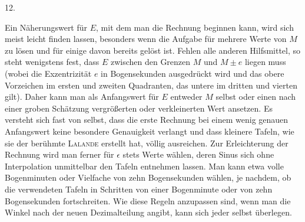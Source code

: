 \par{}
\begin{center}
12.
\end{center}
Ein Näherungswert für $E$, mit dem man die Rechnung beginnen kann, wird sich meist leicht finden lassen, besonders wenn die Aufgabe für mehrere Werte von $M$ zu lösen und für einige davon bereits gelöst ist. Fehlen alle anderen Hilfsmittel, so steht wenigstens fest, dass $E$ zwischen den Grenzen $M$ und $M \pm e$ liegen muss (wobei die Exzentrizität $e$ in Bogensekunden ausgedrückt wird und das obere Vorzeichen im ersten und zweiten Quadranten, das untere im dritten und vierten gilt). Daher kann man als Anfangswert für $E$ entweder $M$ selbst oder einen nach einer groben Schätzung vergrößerten oder verkleinerten Wert ansetzen. Es versteht sich fast von selbst, dass die erste Rechnung bei einem wenig genauen Anfangswert keine besondere Genauigkeit verlangt und dass kleinere Tafeln, wie sie der berühmte \textsc{Lalande} erstellt hat, völlig ausreichen. Zur Erleichterung der Rechnung wird man ferner für $\epsilon$ stets Werte wählen, deren Sinus sich ohne Interpolation unmittelbar den Tafeln entnehmen lassen. Man kann etwa volle Bogenminuten oder Vielfache von zehn Bogensekunden wählen, je nachdem, ob die verwendeten Tafeln in Schritten von einer Bogenminute oder von zehn Bogensekunden fortschreiten. Wie diese Regeln anzupassen sind, wenn man die Winkel nach der neuen Dezimalteilung angibt, kann sich jeder selbst überlegen.
